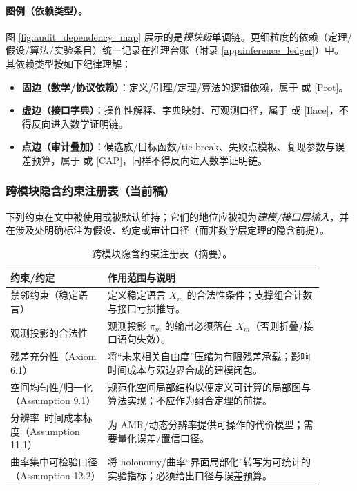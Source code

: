 \paragraph{图例（依赖类型）。}
\AuditTag 图 \ref{fig:audit_dependency_map} 展示的是\emph{模块级}单调链。更细粒度的依赖（定理/假设/算法/实验条目）统一记录在推理台账（附录 \ref{app:inference_ledger}）中。其依赖类型按如下纪律理解：
\begin{itemize}
  \item \textbf{固边（数学/协议依赖）}：定义/引理/定理/算法的逻辑依赖，属于 \MathTag 或 \textsf{[Prot]}。
  \item \textbf{虚边（接口字典）}：操作性解释、字典映射、可观测口径，属于 \InterfaceTag 或 \textsf{[Iface]}，不得反向进入数学证明链。
  \item \textbf{点边（审计叠加）}：候选族/目标函数/tie-break、失败点模板、复现参数与误差预算，属于 \AuditTag 或 \textsf{[CAP]}，同样不得反向进入数学证明链。
\end{itemize}

\subsubsection{跨模块隐含约束注册表（当前稿）}

\AuditTag 下列约束在文中被使用或被默认维持；它们的地位应被视为\emph{建模/接口层输入}，并在涉及处明确标注为假设、约定或审计口径（而非数学层定理的隐含前提）。

\begin{table}[H]
\centering
\begin{tabular}{p{0.28\linewidth} p{0.62\linewidth}}
\toprule
\textbf{约束/约定} & \textbf{作用范围与说明}\\
\midrule
禁邻约束（稳定语言） & 定义稳定语言 $X_m$ 的合法性条件；支撑组合计数与接口亏损推导。\\
观测投影的合法性 & 观测投影 $\pi_m$ 的输出必须落在 $X_m$（否则折叠/接口语句失效）。\\
残差充分性（Axiom 6.1） & 将“未来相关自由度”压缩为有限残差承载；影响时间成本与双边界合成的建模闭包。\\
空间均匀性/归一化（Assumption 9.1） & 规范化空间局部结构以便定义可计算的局部图与算法实现；不应作为组合定理的前提。\\
分辨率--时间成本标度（Assumption 11.1） & 为 AMR/动态分辨率提供可操作的代价模型；需要量化误差/置信口径。\\
曲率集中可检验口径（Assumption 12.2） & 将 holonomy/曲率“界面局部化”转写为可统计的实验指标；必须给出口径与误差预算。\\
\bottomrule
\end{tabular}
\caption{跨模块隐含约束注册表（摘要）。}
\end{table}

